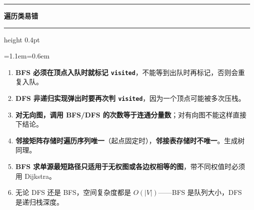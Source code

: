 \documentclass[11pt,openany,UTF8]{ctexbook}
\newcommand{\callouthead}[2]{%
  \par\addvspace{7pt}\noindent
  {\color{#1}\rule[-0.15em]{3pt}{1.05em}}\hspace{0.5em}%
  {\bfseries\color{#1}#2}\par\nobreak\vspace{-0.35em}%
  {\color{rulesep}\hrule height 0.4pt}\nobreak\vspace{0.45em}%
  \begingroup\small\setlength{\parindent}{0pt}%
  \leftskip=1.1em\rightskip=0.6em\noindent\ignorespaces}
\newcommand{\calloutend}{\par\endgroup\addvspace{7pt}}
\newenvironment{callwarn}[1]{\callouthead{warnbar}{#1}}{\calloutend}
\begin{document}
\begin{callwarn}{遍历类易错}
\begin{enumerate}
\item \textbf{BFS 必须在顶点入队时就标记 \texttt{visited}}，不能等到出队时再标记，否则会重复入队。
\item \textbf{DFS 非递归实现弹出时要再次判 \texttt{visited}}，因为一个顶点可能被多次压栈。
\item \textbf{对无向图，调用 BFS/DFS 的次数等于连通分量数}；对有向图不能这样直接下结论。
\item \textbf{邻接矩阵存储时遍历序列唯一}（起点固定时），\textbf{邻接表存储时不唯一}。生成树同理。
\item \textbf{BFS 求单源最短路径只适用于无权图或各边权相等的图}，带不同权值时必须用 Dijkstra。
\item 无论 DFS 还是 BFS，空间复杂度都是 $O(|V|)$——BFS 是队列大小，DFS 是递归栈深度。
\end{enumerate}
\end{callwarn}
\end{document}
